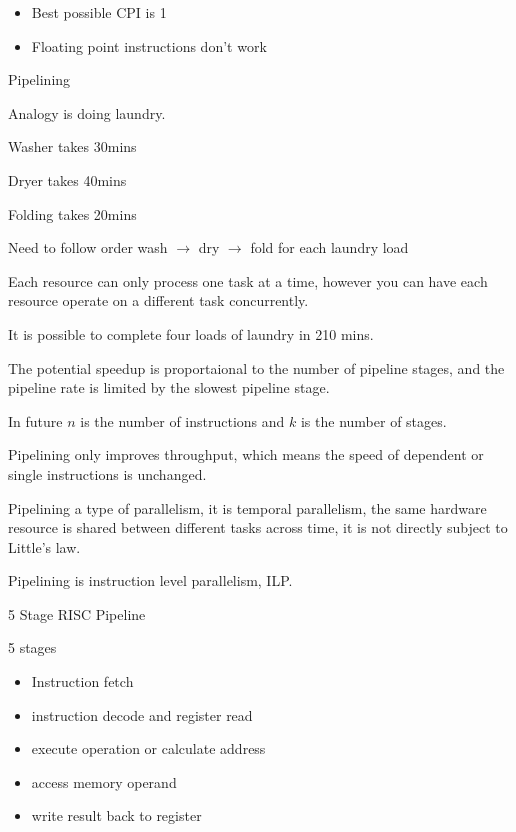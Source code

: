 \documentclass{report}
\begin{document}
\begin{description}
\begin{mdframed}
\begin{itemize}
                \item Best possible CPI is 1
                \item Floating point instructions don't work
            \end{itemize}
        \end{mdframed}
    \item Pipelining
        \begin{mdframed}
            Analogy is doing laundry.

            Washer takes 30mins

            Dryer takes 40mins

            Folding takes 20mins

            Need to follow order wash $\to$ dry $\to$ fold for
            each laundry load

            Each resource can only process one task at a time,
            however you can have each resource operate on
            a different task concurrently.

            It is possible to complete four loads of laundry
            in 210 mins.
        \end{mdframed}
        \begin{mdframed}
            The potential speedup is proportaional to the
            number of pipeline stages, and the pipeline rate
            is limited by the slowest pipeline stage.

            In future $n$ is the number of instructions and
             $k$ is the number of stages.
        \end{mdframed}

        \begin{mdframed}
            Pipelining only improves throughput, which means
            the speed of dependent or single instructions
            is unchanged.
        \end{mdframed}

        \begin{mdframed}
            Pipelining a type of parallelism, it is temporal
            parallelism, the same hardware resource is shared
            between different tasks across time, it is
            not directly subject to Little's law.

            Pipelining is instruction level parallelism, ILP.
        \end{mdframed}

    \item 5 Stage RISC Pipeline
        \begin{mdframed}
           5 stages 
           \begin{itemize}
               \item Instruction fetch
               \item instruction decode and register read
               \item execute operation or calculate address
               \item access memory operand
               \item write result back to register
           \end{itemize}


\end{mdframed}
\end{description}
\end{document}
